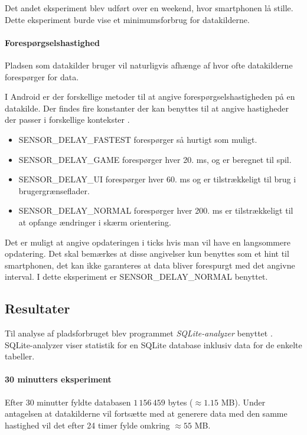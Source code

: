 Det andet eksperiment blev udført over en weekend, hvor smartphonen lå stille.
Dette eksperiment burde vise et minimumsforbrug for datakilderne.

\paragraph{Forespørgselshastighed}
Pladsen som datakilder bruger vil naturligvis afhænge af hvor ofte datakilderne forespørger for data.

I Android er der forskellige metoder til at angive forespørgselshastigheden på en datakilde.
Der findes fire konstanter der kan benyttes til at angive hastigheder der passer i forskellige kontekster \citep{sensormonitor}.

\begin{itemize}
	\item SENSOR\_DELAY\_FASTEST forespørger så hurtigt som muligt.
	\item SENSOR\_DELAY\_GAME forespørger hver 20. ms, og er beregnet til spil.
	\item SENSOR\_DELAY\_UI forespørger hver 60. ms og er tilstrækkeligt til brug i brugergrænseflader.
	\item SENSOR\_DELAY\_NORMAL forespørger hver 200. ms er tilstrækkeligt til at opfange ændringer i skærm orientering.
\end{itemize}

Det er muligt at angive opdateringen i ticks hvis man vil have en langsommere opdatering.
Det skal bemærkes at disse angivelser kun benyttes som et hint til smartphonen, det kan ikke garanteres at data bliver forespurgt med det angivne interval.
I dette eksperiment er SENSOR\_DELAY\_NORMAL benyttet.

\subsection{Resultater}
Til analyse af pladsforbruget blev programmet \textit{SQLite-analyzer} benyttet \citep{sqliteanalyzer}.
SQLite-analyzer viser statistik for en SQLite database inklusiv data for de enkelte tabeller.

\paragraph{30 minutters eksperiment}
Efter 30 minutter fyldte databasen $1\,156\,459$ bytes ($\approx1.15$ MB).
Under antagelsen at datakilderne vil fortsætte med at generere data med den samme hastighed vil det efter 24 timer fylde omkring $\approx55$ MB. 


